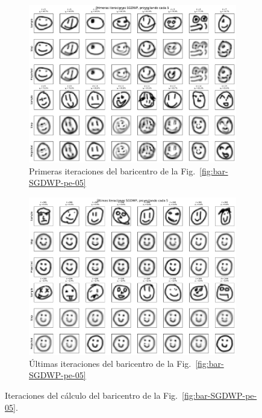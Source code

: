 \begin{figure}[htbp]
    \centering
    \begin{subfigure}[b]{0.8\textwidth}
        \centering
        \includegraphics[width=\textwidth]{img/sgdwp-pe-iters/first-iters-pe-05.pdf}
        \caption{Primeras iteraciones del baricentro de la Fig.~\ref{fig:bar-SGDWP-pe-05}}
        \label{fig:first-iters-pe-05}
    \end{subfigure}
    \begin{subfigure}[b]{0.8\textwidth}
        \centering
        \includegraphics[width=\textwidth]{img/sgdwp-pe-iters/last-iters-pe-05.pdf}
        \caption{Últimas iteraciones del baricentro de la Fig.~\ref{fig:bar-SGDWP-pe-05}}
        \label{fig:last-iters-pe-05}
    \end{subfigure}
    \caption{Iteraciones del cálculo del baricentro de la Fig.~\ref{fig:bar-SGDWP-pe-05}.}
    \label{fig:iters-pe-05}
\end{figure}

